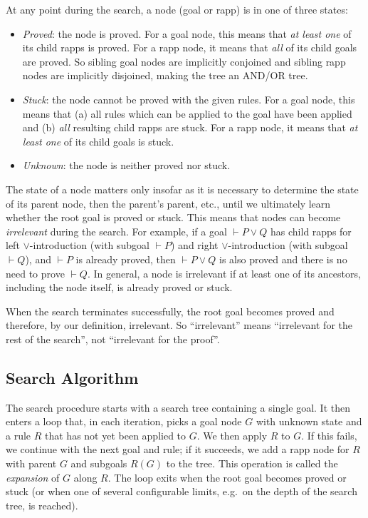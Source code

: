 At any point during the search, a node (goal or rapp) is in one of three states:
\begin{itemize}
  \item
    \emph{Proved}: the node is proved.
    For a goal node, this means that \emph{at least one} of its child rapps is proved.
    For a rapp node, it means that \emph{all} of its child goals are proved.
    So sibling goal nodes are implicitly conjoined and sibling rapp nodes are implicitly disjoined, making the tree an AND/OR tree.
  \item
    \emph{Stuck}: the node cannot be proved with the given rules.
    For a goal node, this means that (a) all rules which can be applied to the goal have been applied and (b) \emph{all} resulting child rapps are stuck.
    For a rapp node, it means that \emph{at least one} of its child goals is stuck.
  \item
    \emph{Unknown}: the node is neither proved nor stuck.
\end{itemize}

The state of a node matters only insofar as it is necessary to determine the state of its parent node, then the parent's parent, etc., until we ultimately learn whether the root goal is proved or stuck.
This means that nodes can become \emph{irrelevant} during the search.
For example, if a goal $⊢ P ∨ Q$ has child rapps for left $∨$-introduction (with subgoal $⊢ P$) and right $∨$-introduction (with subgoal $⊢ Q$), and $⊢ P$ is already proved, then $⊢ P ∨ Q$ is also proved and there is no need to prove $⊢ Q$.
In general, a node is irrelevant if at least one of its ancestors, including the node itself, is already proved or stuck.

When the search terminates successfully, the root goal becomes proved and therefore, by our definition, irrelevant.
So \enquote{irrelevant} means \enquote{irrelevant for the rest of the search}, not \enquote{irrelevant for the proof}.


\subsection{Search Algorithm}%
\label{sec:aesop:search}

The search procedure starts with a search tree containing a single goal.
It then enters a loop that, in each iteration, picks a goal node $G$ with unknown state and a rule $R$ that has not yet been applied to $G$.
We then apply $R$ to $G$.
If this fails, we continue with the next goal and rule; if it succeeds, we add a rapp node for $R$ with parent $G$ and subgoals $R(G)$ to the tree.
This operation is called the \emph{expansion} of $G$ along $R$.
The loop exits when the root goal becomes proved or stuck (or when one of several configurable limits, e.g.\ on the depth of the search tree, is reached).

